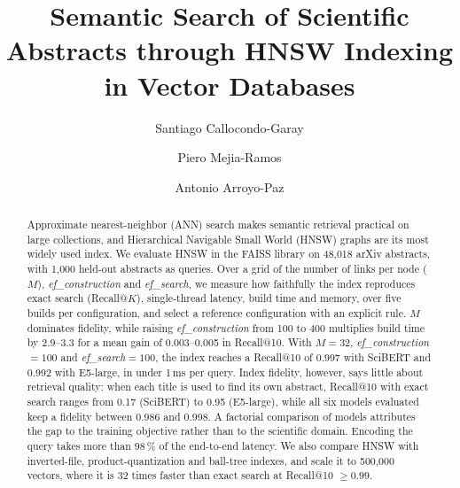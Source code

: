 \documentclass[runningheads]{llncs}
\newcommand{\efc}{\textit{ef\_construction}}
\newcommand{\efs}{\textit{ef\_search}}
\begin{document}
\title{Semantic Search of Scientific Abstracts through HNSW
Indexing in Vector Databases}

\author{Santiago Callocondo-Garay \and
Piero Mejia-Ramos \and
Antonio Arroyo-Paz}



\maketitle

\begin{abstract}
Approximate nearest-neighbor (ANN) search makes semantic retrieval practical on large
collections, and Hierarchical Navigable Small World (HNSW) graphs are its most widely used
index. We evaluate HNSW in the FAISS library on 48,018 arXiv abstracts, with 1,000 held-out
abstracts as queries. Over a grid of the number of links per node ($M$), \efc{} and \efs{},
we measure how faithfully the index reproduces exact search (Recall@$K$), single-thread
latency, build time and memory, over five builds per configuration, and select a reference
configuration with an explicit rule. $M$ dominates fidelity, while raising \efc{} from 100
to 400 multiplies build time by 2.9--3.3 for a mean gain of 0.003--0.005 in Recall@10. With
$M=32$, \efc{}$=100$ and \efs{}$=100$, the index reaches a Recall@10 of 0.997 with SciBERT and
0.992 with E5-large, in under 1\,ms per query. Index fidelity, however, says little about
retrieval quality: when each title is used to find its own abstract, Recall@10 with exact
search ranges from 0.17 (SciBERT) to 0.95 (E5-large), while all six models evaluated keep a fidelity
between 0.986 and 0.998. A factorial comparison of models attributes the gap to the
training objective rather than to the scientific domain. Encoding the query takes more than
98\,\% of the end-to-end latency. We also compare HNSW with inverted-file, product-quantization
and ball-tree indexes, and scale it to 500,000 vectors, where it is 32 times faster than
exact search at Recall@10 $\geq 0.99$.

\end{abstract}
\end{document}
